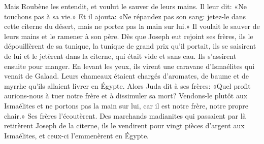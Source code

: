 Mais Roubène les entendit, et voulut le sauver de leurs mains.
	Il leur dit: «Ne touchons pas à sa vie.»
Et il ajouta: «Ne répandez pas son sang:
	jetez-le dans cette citerne du désert, mais ne portez pas la main sur lui.»
Il voulait le sauver de leurs mains et le ramener à son père.
Dès que Joseph eut rejoint ses frères,
	ils le dépouillèrent de sa tunique, la tunique de grand prix qu’il portait,
	ils se saisirent de lui et le jetèrent dans la citerne, qui était vide et sans eau.
Ils s’assirent ensuite pour manger.
En levant les yeux, ils virent une caravane d’Ismaélites qui venait de Galaad.
Leurs chameaux étaient chargés d’aromates, de baume et de myrrhe
	qu’ils allaient livrer en Égypte.
Alors Juda dit à ses frères:
	«Quel profit aurions-nous à tuer notre frère et à dissimuler sa mort?
	Vendons-le plutôt aux Ismaélites et ne portons pas la main sur lui,
	car il est notre frère, notre propre chair.»
Ses frères l’écoutèrent.
Des marchands madianites qui passaient par là retirèrent Joseph de la citerne,
	ils le vendirent pour vingt pièces d’argent aux Ismaélites,
	et ceux-ci l’emmenèrent en Égypte.
